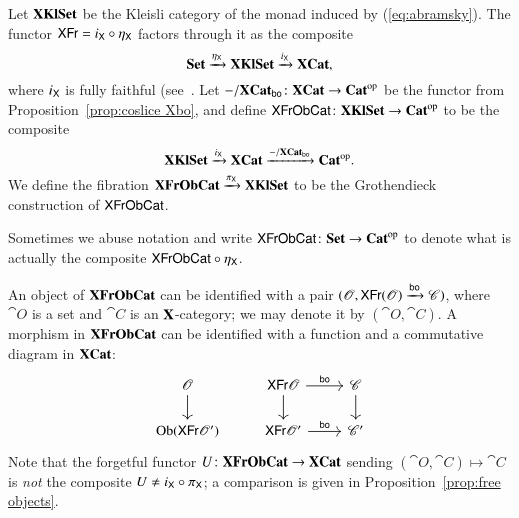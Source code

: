 \documentclass[12pt,oneside,article,draft]{memoir}
\begin{document}
\begin{definition}\label{def:XKlSet XFrObCat}
	Let $\mathbf{XKlSet}$ be the Kleisli category of the monad induced by (\ref{eq:abramsky}).
	The functor $\mathsf{XFr}=i_{\mathsf{X}}\circ\eta_{\mathsf{X}}$ factors through it as the composite 
		$$\mathbf{Set}\xrightarrow{\eta_{\mathsf{X}}}\mathbf{XKlSet}\xrightarrow{i_{\mathsf{X}}}\mathbf{XCat},$$ 
	where $i_{\mathsf{X}}$ is fully faithful (see~\cite[Proposition 4.2.1]{BorceuxV2}. 
	Let $-/\mathbf{XCat}_{\mathsf{bo}}\colon\mathbf{XCat}\to{\mathbf{Cat}}^{\text{op}}$ be the functor from Proposition~\ref{prop:coslice Xbo}, and define $\mathsf{XFrObCat}\colon\mathbf{XKlSet}\to{\mathbf{Cat}}^{\text{op}}$ to be the composite
		$$\mathbf{XKlSet}\xrightarrow{i_{\mathsf{X}}}\mathbf{XCat}\xrightarrow{-/\mathbf{XCat}_{\mathsf{bo}}}{\mathbf{Cat}}^{\text{op}}.$$
	We define the fibration $\mathbf{XFrObCat}\xrightarrow{\pi_{\mathsf{X}}}\mathbf{XKlSet}$ to be the Grothendieck construction of $\mathsf{XFrObCat}$. 

	Sometimes we abuse notation and write $\mathsf{XFrObCat}\colon\mathbf{Set}\to{\mathbf{Cat}}^{\text{op}}$ to denote what is actually the composite $\mathsf{XFrObCat}\circ\eta_{\mathsf{X}}$.
\end{definition}

An object of $\mathbf{XFrObCat}$ can be identified with a pair $(\mathscr{O},\mathsf{XFr}(\mathscr{O})\xrightarrow{\mathsf{bo}}\mathscr{C})$, where $\cat{O}$ is a set and $\cat{C}$ is an $\mathbf{X}$-category; we may denote it by $(\cat{O},\cat{C})$.
A morphism in $\mathbf{XFrObCat}$ can be identified with a function and a commutative diagram in $\mathbf{XCat}$:
$$
\begin{tikzcd}
	\cat{O}\ar[d]&\Fun{XFr}\cat{O}\ar[r,"\bo"]\ar[d]&\cat{C}\ar[d]\\
	\Ob(\Fun{XFr}\cat{O'})&\Fun{XFr}\cat{O'}\ar[r,"\bo"]&\cat{C'}
\end{tikzcd}
$$
Note that the forgetful functor $U\colon\mathbf{XFrObCat}\to\mathbf{XCat}$ sending $(\cat{O},\cat{C})\mapsto\cat{C}$ is \emph{not} the composite $U\neq i_{\mathsf{X}}\circ\pi_{\mathsf{X}}$; a comparison is given in Proposition~\ref{prop:free objects}.
\end{document}
